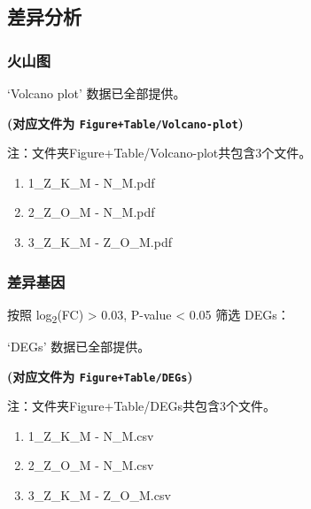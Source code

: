 \documentclass[
]{article}
\providecommand{\tightlist}{%
  \setlength{\itemsep}{0pt}\setlength{\parskip}{0pt}}
\begin{document}
\hypertarget{all}{%
\subsection{差异分析}\label{all}}

\hypertarget{ux706bux5c71ux56fe}{%
\subsubsection{火山图}\label{ux706bux5c71ux56fe}}

`Volcano plot' 数据已全部提供。

\textbf{(对应文件为 \texttt{Figure+Table/Volcano-plot})}

\begin{center}\begin{tcolorbox}[colback=gray!10, colframe=gray!50, width=0.9\linewidth, arc=1mm, boxrule=0.5pt]注：文件夹Figure+Table/Volcano-plot共包含3个文件。

\begin{enumerate}\tightlist
\item 1\_Z\_K\_M - N\_M.pdf
\item 2\_Z\_O\_M - N\_M.pdf
\item 3\_Z\_K\_M - Z\_O\_M.pdf
\end{enumerate}\end{tcolorbox}
\end{center}

\hypertarget{ux5deeux5f02ux57faux56e0}{%
\subsubsection{差异基因}\label{ux5deeux5f02ux57faux56e0}}

按照 \textbar log\textsubscript{2}(FC)\textbar{} \textgreater{} 0.03, P-value \textless{} 0.05 筛选 DEGs：

`DEGs' 数据已全部提供。

\textbf{(对应文件为 \texttt{Figure+Table/DEGs})}

\begin{center}\begin{tcolorbox}[colback=gray!10, colframe=gray!50, width=0.9\linewidth, arc=1mm, boxrule=0.5pt]注：文件夹Figure+Table/DEGs共包含3个文件。

\begin{enumerate}\tightlist
\item 1\_Z\_K\_M - N\_M.csv
\item 2\_Z\_O\_M - N\_M.csv
\item 3\_Z\_K\_M - Z\_O\_M.csv
\end{enumerate}\end{tcolorbox}
\end{center}
\end{document}
